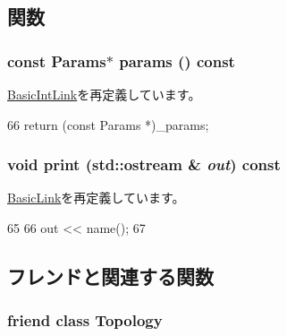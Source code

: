 \subsection{関数}
\hypertarget{classSimpleIntLink_acd3c3feb78ae7a8f88fe0f110a718dff}{
\subsubsection[{params}]{\setlength{\rightskip}{0pt plus 5cm}const {\bf Params}$\ast$ params () const}}
\label{classSimpleIntLink_acd3c3feb78ae7a8f88fe0f110a718dff}


\hyperlink{classBasicIntLink_acd3c3feb78ae7a8f88fe0f110a718dff}{BasicIntLink}を再定義しています。


\begin{DoxyCode}
66 { return (const Params *)_params; }
\end{DoxyCode}
\hypertarget{classSimpleIntLink_ac55fe386a101fbae38c716067c9966a0}{
\subsubsection[{print}]{\setlength{\rightskip}{0pt plus 5cm}void print (std::ostream \& {\em out}) const}}
\label{classSimpleIntLink_ac55fe386a101fbae38c716067c9966a0}


\hyperlink{classBasicLink_ac55fe386a101fbae38c716067c9966a0}{BasicLink}を再定義しています。


\begin{DoxyCode}
65 {
66     out << name();
67 }
\end{DoxyCode}


\subsection{フレンドと関連する関数}
\hypertarget{classSimpleIntLink_acd2b8699ab7559c0da687cd775e2c778}{
\subsubsection[{Topology}]{\setlength{\rightskip}{0pt plus 5cm}friend class {\bf Topology}}}
\label{classSimpleIntLink_acd2b8699ab7559c0da687cd775e2c778}


